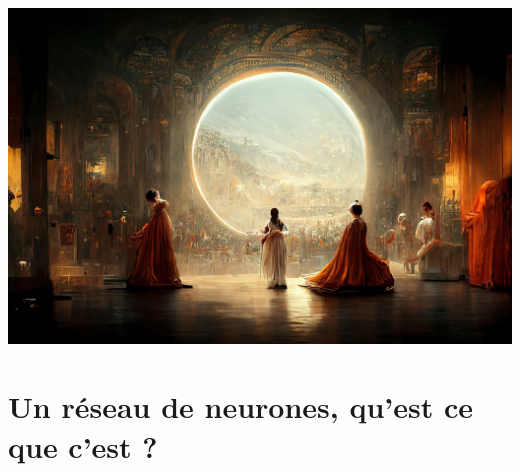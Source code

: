 \documentclass[aspectratio=169, usenames, dvipsnames]{beamer}
\begin{document}
{\begin{frame}
    \vfill
  \end{frame}

  \begin{frame}
    \centering
    \vfill
    \includegraphics[height=\textheight]{ai_art}
    \vfill
  \end{frame}

}

\section{Un réseau de neurones, qu'est ce que c'est ?}
\begin{frame}
  \sectionpage
\end{frame}
\end{document}

